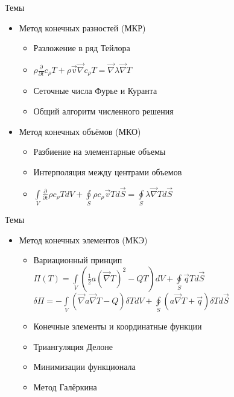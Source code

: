 \documentclass[12pt]{beamer}
\begin{document}
\begin{frame}{Темы}
    \begin{itemize}
    \item Метод конечных разностей (МКР)
            \begin{itemize}
                \item Разложение в ряд Тейлора        
                \item $\rho \frac{\partial}{\partial t} c_{\rho} T + \rho \vec{v} \vec{\nabla} c_{\rho} T = \vec{\nabla}  \lambda \vec{\nabla} T$
                \item Сеточные числа Фурье и Куранта
                \item Общий алгоритм численного решения      
            \end{itemize}     
            \vspace{0.2 cm}  
        \item Метод конечных объёмов (МКО)
            \begin{itemize}
                \item Разбиение на элементарные объемы
                \item Интерполяция между центрами объемов
                \item $\int \limits_{V} \frac{\partial}{\partial t} \rho c_{\rho} T dV + \oint \limits_{S}  \rho c_{\rho} \vec{v}  T d \vec{S}= \oint \limits_{S}  \lambda \vec{\nabla} T d \vec{S}$               
            \end{itemize}                   
    \end{itemize}
\end{frame}

\begin{frame}{Темы}
    \begin{itemize}    
        \item Метод конечных элементов (МКЭ)       
            \begin{itemize}
                \item Вариационный принцип \\      
                $\Pi\left(T\right) = \int \limits_{V} \left( 
                \frac{1}{2}a \left(\vec{\nabla}T\right)^2 - QT\right)dV +
                \oint \limits_{S}  \vec{q}  T d \vec{S}$\\
               $ \delta \Pi = - \int \limits_{V} \left( 
                \vec{\nabla}a\vec{\nabla}T - Q\right) \delta T dV +
                \oint \limits_{S} \left(a\vec{\nabla}T + \vec{q}  \right) \delta T d \vec{S}$
                \item Конечные элементы и координатные функции
                \item Триангуляция Делоне 
                \item Минимизации функционала   
                \item Метод Галёркина                         
            \end{itemize}              
    \end{itemize}
\end{frame}
\end{document}
